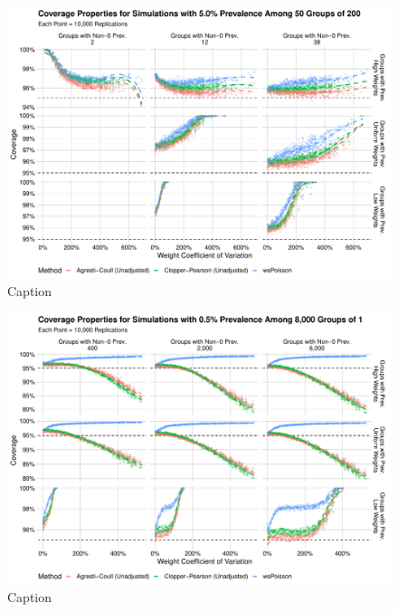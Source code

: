 \documentclass[AMA,STIX1COL]{WileyNJD-v2}
\begin{document}
\begin{figure}
    \centering
    \includegraphics[width=\textwidth]{figures/perfect_coverage_50_0_05_reduced.pdf}
    \caption{Caption}
    \label{fig:perfect_coverage_50_0_05_reduced}
\end{figure}


\begin{figure}
    \centering
    \includegraphics[width=\textwidth]{figures/perfect_coverage_8000_0_005_reduced.pdf}
    \caption{Caption}
    \label{fig:perfect_coverage_8000_0_005_reduced}
\end{figure}
\end{document}
